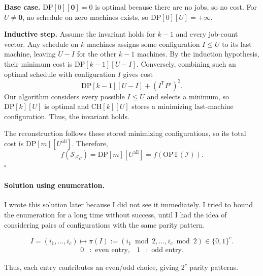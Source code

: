 \documentclass[12pt,a4paper]{article}
\theoremstyle{definition}
\theoremstyle{plain}
\begin{document}
\begin{enumerate}
\textbf{Base case.} $\mathrm{DP}[0][\mathbf{0}]=0$ is optimal because there are
no jobs, so no cost. For $U\neq\mathbf{0}$, no schedule on zero machines
exists, so $\mathrm{DP}[0][U]=+\infty$.

\textbf{Inductive step.} Assume the invariant holds for $k-1$ and every job-count
vector. Any schedule on $k$ machines assigns some configuration $I\leq U$
to its last machine, leaving $U-I$ for the other $k-1$ machines. By the
induction hypothesis, their minimum cost is $\mathrm{DP}[k-1][U-I]$.
Conversely, combining such an optimal schedule with configuration $I$
gives cost
\[
\mathrm{DP}[k-1][U-I]+(I^{\mathsf T}P')^2.
\]
Our algorithm considers every possible $I\leq U$ and selects a minimum,
so $\mathrm{DP}[k][U]$ is optimal and $\mathrm{CH}[k][U]$ stores a
minimizing last-machine configuration. Thus, the invariant holds.

The reconstruction follows these stored minimizing
configurations, so its total cost is $\mathrm{DP}[m][U^{\mathrm{all}}]$.
Therefore,
\[
f(\mathcal{S}_{\mathcal{A}_C})
=\mathrm{DP}[m][U^{\mathrm{all}}]
=f(\mathrm{OPT}(\mathcal{I})).
\]
\hfill$\square$
\end{enumerate}

\paragraph{Solution using enumeration.}
I wrote this solution later because I did not see it immediately. I tried
to bound the enumeration for a long time without success, until I had
the idea of considering pairs of configurations with the same parity pattern.

\begin{definition}
\[
I=(i_1,\ldots,i_c)
\longmapsto\pi(I):=(i_1\bmod2,\ldots,i_c\bmod2)\in\{0,1\}^c.
\]
\[
\begin{aligned}
0 &:\text{ even entry}, & 1 &:\text{ odd entry}.
\end{aligned}
\]
\end{definition}
Thus, each entry contributes an even/odd choice, giving $2^c$ parity patterns.
\end{document}

